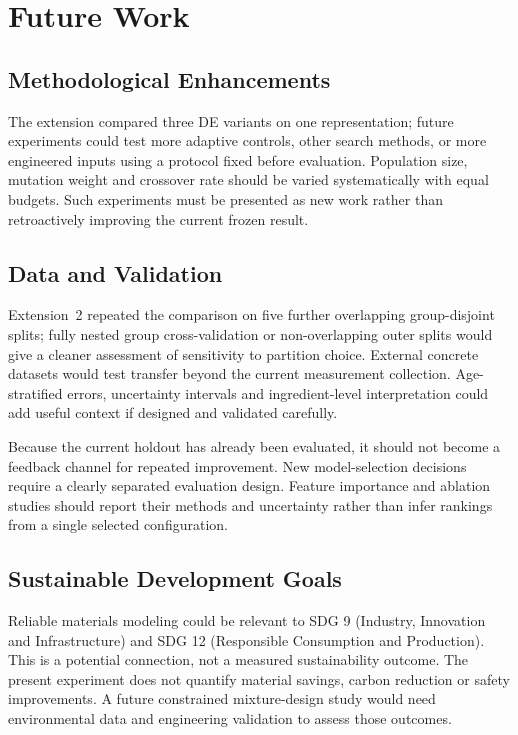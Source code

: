 \chapter{Future Work}
\section{Methodological Enhancements}
The extension compared three DE variants on one representation; future experiments could test more adaptive controls, other search methods, or more engineered inputs using a protocol fixed before evaluation. Population size, mutation weight and crossover rate should be varied systematically with equal budgets. Such experiments must be presented as new work rather than retroactively improving the current frozen result.
\section{Data and Validation}
Extension~2 repeated the comparison on five further overlapping group-disjoint splits; fully nested group cross-validation or non-overlapping outer splits would give a cleaner assessment of sensitivity to partition choice. External concrete datasets would test transfer beyond the current measurement collection. Age-stratified errors, uncertainty intervals and ingredient-level interpretation could add useful context if designed and validated carefully.

Because the current holdout has already been evaluated, it should not become a feedback channel for repeated improvement. New model-selection decisions require a clearly separated evaluation design. Feature importance and ablation studies should report their methods and uncertainty rather than infer rankings from a single selected configuration.
\section{Sustainable Development Goals}
Reliable materials modeling could be relevant to SDG 9 (Industry, Innovation and Infrastructure) and SDG 12 (Responsible Consumption and Production). This is a potential connection, not a measured sustainability outcome. The present experiment does not quantify material savings, carbon reduction or safety improvements. A future constrained mixture-design study would need environmental data and engineering validation to assess those outcomes.
